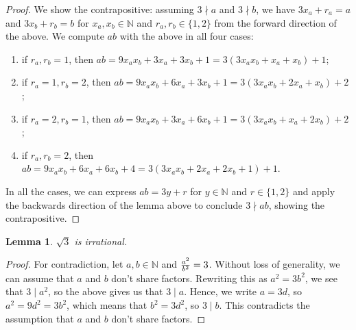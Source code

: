 \documentclass{article}
\newcommand{\N}{\mathbb{N}}
\newtheorem*{lemma}{Lemma}
\begin{document}
\begin{proof}
We show the contrapositive: assuming $3 \nmid a$ and $3 \nmid b$, we have $3x_a + r_a = a$ and
$3x_b + r_b = b$ for $x_a, x_b \in \N$ and $r_a, r_b \in \{1, 2\}$ from the forward direction of the above.
We compute $ab$ with the above in all four cases:
\begin{enumerate}
    \item if $r_a, r_b = 1$, then $ab = 9 x_a x_b + 3 x_a + 3 x_b + 1 = 3(3 x_a x_b + x_a + x_b) + 1$;
    \item if $r_a = 1, r_b = 2$, then $ab = 9 x_a x_b + 6 x_a + 3 x_b + 1 = 3(3 x_a x_b + 2 x_a + x_b) + 2$;
    \item if $r_a = 2, r_b = 1$, then $ab = 9 x_a x_b + 3 x_a + 6 x_b + 1 = 3(3 x_a x_b + x_a + 2 x_b) + 2$;
    \item if $r_a, r_b = 2$, then $ab = 9 x_a x_b + 6 x_a + 6 x_b + 4 = 3(3 x_a x_b + 2 x_a + 2 x_b + 1) + 1$.
\end{enumerate}
In all the cases, we can express $ab = 3y + r$ for $y \in \N$ and $r \in \{1, 2\}$ and apply the backwards direction of
the lemma above to conclude $3 \nmid ab$, showing the contrapositive.
\end{proof}

\begin{lemma}
$\sqrt{3}$ is irrational.
\end{lemma}

\begin{proof}
For contradiction, let $a, b \in \N$ and ${a^2 \over b^2} = 3$. Without loss of generality, we can assume that $a$ and $b$ don't
share factors. Rewriting this as $a^2 = 3 b^2$, we see that $3 \mid a^2$, so the above gives us that $3 \mid a$.
Hence, we write $a = 3d$, so $a^2 = 9 d^2 = 3 b^2$, which means that $b^2 = 3 d^2$, so $3 \mid b$. This contradicts the assumption
that $a$ and $b$ don't share factors.
\end{proof}
\end{document}
